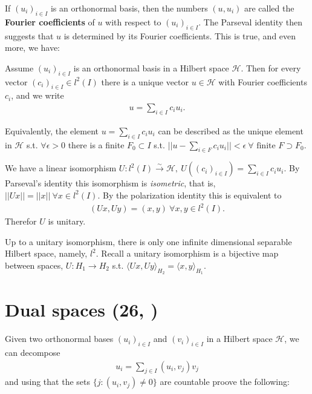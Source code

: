 If \((u_i)_{i\in I }\) is an orthonormal basis, then the numbers \((u,u_i)\) are called the \textbf{Fourier coefficients} of \(u\) with 
respect to \((u_i)_{i\in I}\). The Parseval identity then suggests that \(u\) is determined by its Fourier coefficients. This is true, 
and even more, we have:
\begin{proposition}
    Assume \((u_i)_{i\in I}\) is an orthonormal basis in a Hilbert space \(\mathcal{H}\). Then for every vector \((c_i)_{i\in I}\in l^2(I)\)
    there is a unique vector \(u\in \mathcal{H}\) with Fourier coefficients \(c_i\), and we write
    \begin{align*}
        u = \sum\limits_{i\in I} c_i u_i.
    \end{align*}
\end{proposition}
\begin{remark}
    Equivalently, the element \(u=\sum_{i\in I}c_i u_i\) can be described as the unique element in \(\mathcal{H}\) s.t. \(\forall \epsilon>0\)
    there is a finite \(F_0\subset I\) s.t. \(||u - \sum_{i\in F}c_i u_i || < \epsilon \ \forall \text{ finite } F\supset F_0\).
\end{remark}
\begin{corollary}
    We have a linear isomorphism \(U:l^2(I)\xrightarrow[ ]{\sim}\mathcal{H}, \ U\left((c_i)_{i\in I}\right) = \sum_{i\in I}c_i u_i\).
    By Parseval's identity this isomorphism is \emph{isometric}, that is, \(||Ux|| = ||x|| \ \forall x\in l^2(I)\). By the polarization identity
    this is equivalent to 
    \begin{align*}
        (Ux,Uy) = (x,y) \ \forall x,y\in l^2(I).
    \end{align*}
    Therefor \(U\) is unitary.
\end{corollary}
\begin{corollary}
    Up to a unitary isomorphism, there is only one infinite dimensional separable Hilbert space, namely, \(l^2\). Recall a unitary isomorphism is a bijective map between spaces, \(U:H_1\rightarrow H_2\) s.t. \(\langle Ux, Uy\rangle_{H_2} = \langle x,y\rangle_{H_1}\).
\end{corollary}

\section{Dual spaces \tiny{(26, \cite{schilling2017measures})}}
\ifdetailed 
Given two orthonormal bases \((u_i)_{i\in I}\) and \((v_i)_{i\in I}\) in a Hilbert space \(\mathcal{H}\), we can decompose
\begin{align*}
    u_i = \sum\limits_{j\in I} (u_i,v_j)v_j
\end{align*}
and using that the sets \(\{j:(u_i,v_j)\neq 0\}\) are countable proove the following:

